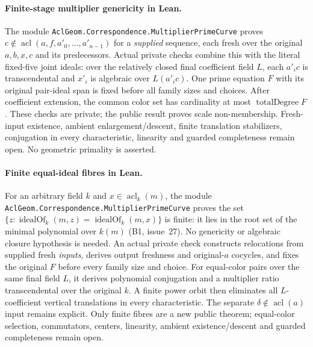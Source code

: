 \documentclass[11pt,oneside]{article}
\theoremstyle{definition}
\theoremstyle{remark}
\newcommand{\acl}{\operatorname{acl}}
\newcommand{\lean}[1]{\nolinkurl{#1}}
\begin{document}
\paragraph{Finite-stage multiplier genericity in Lean.}
The module \lean{AclGeom.Correspondence.MultiplierPrimeCurve} proves
$c\notin\acl(a,f,a'_0,\ldots,a'_{n-1})$ for a \emph{supplied}
sequence, each fresh over the original $a,b,x,c$ and its predecessors.
Actual private checks combine this with the literal fixed-five joint
ideals: over the relatively closed final coefficient field $L$,
each $a'_i c$ is transcendental and $x'_i$ is algebraic over $L(a'_i c)$.
One prime equation $F$ with its original pair-ideal span is fixed
before all family sizes and choices. After coefficient extension,
the common color set has cardinality at most $\operatorname{totalDegree}F$.
These checks are private; the public result proves scale non-membership.
Fresh-input existence, ambient enlargement/descent, finite translation
stabilizers, conjugation in every characteristic, linearity and guarded
completeness remain open. No geometric primality is asserted.

\paragraph{Finite equal-ideal fibres in Lean.}
For an arbitrary field $k$ and $x\in\acl_k(m)$, the module
\lean{AclGeom.Correspondence.MultiplierPrimeCurve} proves the set
$\{z:\operatorname{idealOf}_k(m,z)=\operatorname{idealOf}_k(m,x)\}$
is finite: it lies in the root set of the minimal polynomial over $k(m)$
(B1, issue~27). No genericity or algebraic closure hypothesis is needed.
An actual private check constructs relocations from supplied fresh
\emph{inputs}, derives output freshness and original-$a$ cocycles,
and fixes the original $F$ before every family size and choice.
For equal-color pairs over the same final field $L$, it derives
polynomial conjugation and a multiplier ratio transcendental over the
original $k$. A finite power orbit then eliminates all $L$-coefficient
vertical translations in every characteristic.
The separate $\delta\notin\acl(a)$ input remains explicit.
Only finite fibres are a new public theorem; equal-color selection,
commutators, centers, linearity, ambient existence/descent and
guarded completeness remain open.
\end{document}
